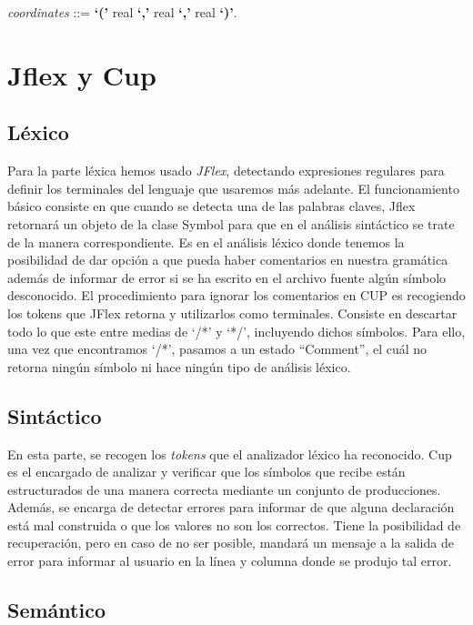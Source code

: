 \documentclass[12pt]{article}
\begin{document}
\noindent \textit{coordinates} ::= \textbf{`('} real \textbf{`,'} real \textbf{`,'} real \textbf{`)'}.

\section{Jflex y Cup}

\subsection{Léxico}

Para la parte léxica hemos usado \textit{JFlex}, detectando expresiones regulares para definir los terminales del lenguaje que usaremos más adelante.
El funcionamiento básico consiste en que cuando se detecta una de las palabras claves, Jflex retornará un objeto de la clase Symbol para que en el análisis sintáctico se trate de la manera correspondiente.
Es en el análisis léxico donde tenemos la posibilidad de dar opción a que pueda haber comentarios en nuestra gramática además de informar de error si se ha escrito en el archivo fuente algún símbolo desconocido. El procedimiento para ignorar los comentarios en CUP es recogiendo los tokens que JFlex retorna y utilizarlos como terminales. Consiste en descartar todo lo que este entre medias de `/*' y `*/', incluyendo dichos símbolos. Para ello, una vez que encontramos `/*', pasamos a un estado ``Comment'', el cuál no retorna ningún símbolo ni hace ningún tipo de análisis léxico.

\subsection{Sintáctico}

En esta parte, se recogen los \textit{tokens} que el analizador léxico ha reconocido. Cup es el encargado de analizar y verificar que los símbolos que recibe están estructurados de una manera correcta mediante un conjunto de producciones. Además, se encarga de detectar errores para informar de que alguna declaración está mal construida o que los valores no son los correctos. Tiene
la posibilidad de recuperación, pero en caso de no ser posible, mandará un mensaje a la salida de error para informar al usuario en la
línea y columna donde se produjo tal error.

\subsection{Semántico}
\end{document}
